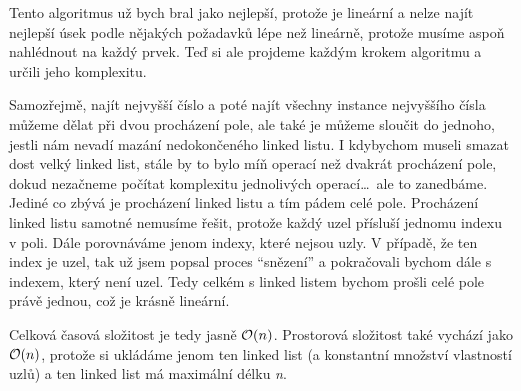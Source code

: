 \documentclass{../../../ksp}
\begin{document}
Tento algoritmus už bych bral jako nejlepší, protože je lineární a nelze najít nejlepší úsek podle nějakých požadavků lépe než lineárně, protože musíme aspoň nahlédnout na každý prvek.
Teď si ale projdeme každým krokem algoritmu a určili jeho komplexitu.

Samozřejmě, najít nejvyšší číslo a poté najít všechny instance nejvyššího čísla můžeme dělat při dvou procházení pole, ale také je můžeme sloučit do jednoho, jestli nám nevadí mazání nedokončeného linked listu.
I kdybychom museli smazat dost velký linked list, stále by to bylo míň operací než dvakrát procházení pole, dokud nezačneme počítat komplexitu jednolivých operací\ldots\ ale to zanedbáme.
Jediné co zbývá je procházení linked listu a tím pádem celé pole. Procházení linked listu samotné nemusíme řešit, protože každý uzel přísluší jednomu indexu v poli.
Dále porovnáváme jenom indexy, které nejsou uzly. V případě, že ten index je uzel, tak už jsem popsal proces ``snězení'' a pokračovali bychom dále s indexem, který není uzel.
Tedy celkém s linked listem bychom prošli celé pole právě jednou, což je krásně lineární.

Celková časová složitost je tedy jasně $\mathcal{O}(n)$. Prostorová složitost také vychází jako $\mathcal{O}(n)$, protože si ukládáme jenom ten linked list (a konstantní množství vlastností uzlů)
a ten linked list má maximální délku \emph{n}.
\end{document}
